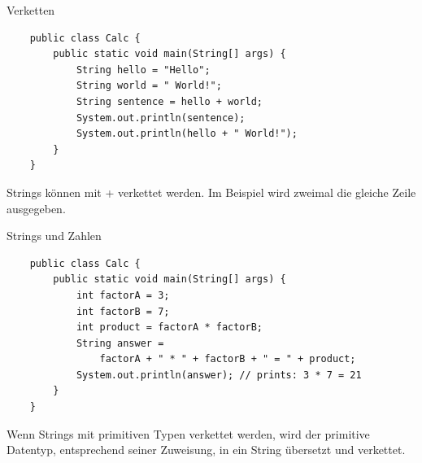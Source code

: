 \begin{frame}[fragile]{Verketten}
	\begin{lstlisting}
	public class Calc {
	    public static void main(String[] args) {
	        String hello = "Hello";
	        String world = " World!";
	        String sentence = hello + world;
	        System.out.println(sentence);
	        System.out.println(hello + " World!");
	    }
	}
	\end{lstlisting}
	Strings können mit + verkettet werden. 
	Im Beispiel wird zweimal die gleiche Zeile ausgegeben.
\end{frame}

\begin{frame}[fragile]{Strings und Zahlen}
	\begin{lstlisting}
	public class Calc {
	    public static void main(String[] args) {
	    	int factorA = 3;
	    	int factorB = 7;
	    	int product = factorA * factorB;
	    	String answer = 
	            factorA + " * " + factorB + " = " + product;
	        System.out.println(answer); // prints: 3 * 7 = 21
	    }
	}
	\end{lstlisting}
	Wenn Strings mit primitiven Typen verkettet werden, wird der primitive Datentyp,
	entsprechend seiner Zuweisung, in ein String übersetzt und verkettet.
\end{frame}

